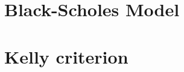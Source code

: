 \section{Black-Scholes Model}
\label{finance:black_scholes}

\section{Kelly criterion}
\label{finance:kelly}
